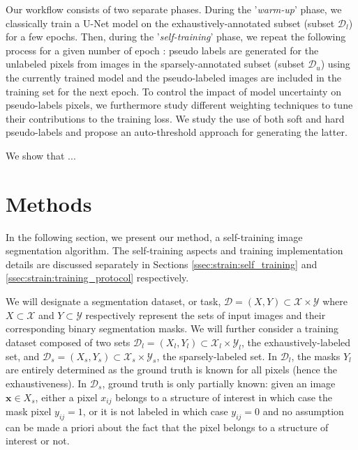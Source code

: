 Our workflow consists of two separate phases. During the '\textit{warm-up}' phase, we classically train a U-Net model on the exhaustively-annotated subset (subset $\mathcal{D}_l$) for a few epochs. Then, during the '\textit{self-training}' phase, we repeat the following process for a given number of epoch : pseudo labels are generated for the unlabeled pixels from images in the sparsely-annotated subset (subset $\mathcal{D}_u$) using the currently trained model and the pseudo-labeled images are included in the training set for the next epoch. To control the impact of model uncertainty on pseudo-labels pixels, we furthermore study different weighting techniques to tune their contributions to the training loss. We study the use of both soft and hard pseudo-labels and propose an auto-threshold approach for generating the latter. 

We show that ... 

\section{Methods}
\label{sec:strain:methods}

In the following section, we present our method, a self-training image segmentation algorithm. The self-training aspects and training implementation details are discussed separately in Sections \ref{ssec:strain:self_training} and \ref{ssec:strain:training_protocol} respectively.

We will designate a segmentation dataset, or task, $\mathcal{D} = \left(X, Y\right) \subset \mathcal{X} \times \mathcal{Y}$ where $X \subset \mathcal{X}$ and $Y \subset \mathcal{Y}$ respectively represent the sets of input images and their corresponding binary segmentation masks. We will further consider a training dataset composed of two sets $\mathcal{D}_l = \left(X_l, Y_l\right) \subset \mathcal{X}_l \times \mathcal{Y}_l$, the exhaustively-labeled set, and $\mathcal{D}_s = \left(X_s, Y_s\right) \subset \mathcal{X}_s \times \mathcal{Y}_s$, the sparsely-labeled set. In $\mathcal{D}_l$, the masks $Y_l$ are entirely determined as the ground truth is known for all pixels (hence the exhaustiveness). In $\mathcal{D}_s$, ground truth is only partially known: given an image $\mathbf{x} \in X_s$, either a pixel $x_{ij}$ belongs to a structure of interest in which case the mask pixel $y_{ij} = 1$, or it is not labeled in which case $y_{ij} = 0$ and no assumption can be made a priori about the fact that the pixel belongs to a structure of interest or not. 

